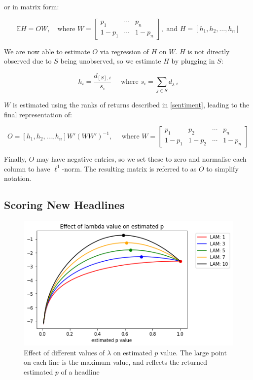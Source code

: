 \noindent
or in matrix form:

\begin{equation}
\mathbb{E}H = OW, \quad \text{where } W = \begin{bmatrix}
      p_1 & \cdots & p_n \\
      1-p_1 & \cdots & 1-p_n
\end{bmatrix}
, \text{ and } H = [h_1,h_2,\dots,h_n]
\end{equation}

\noindent
We are now able to estimate $O$ via regression of $H$ on $W$. $H$ is not directly observed due to $S$ being unobserved, so we estimate $H$ by plugging in $S$:

\begin{equation}
h_i = \frac{d_{[S],i}}{s_i} \quad \text{ where } s_i = \sum_{j \in S} d_{j,i}
\end{equation}

\noindent
$W$ is estimated using the ranks of returns described in \ref{sentiment}, leading to the final representation of:

\begin{equation}
O = [h_1, h_2,\dots, h_n] W' (W W')^{-1}, \quad \text{ where } W = \begin{bmatrix}
      p_1 & p_2 & \cdots & p_n \\
      1-p_1 & 1-p_2 & \cdots & 1-p_n
\end{bmatrix}
\end{equation}

\noindent
Finally, $O$ may have negative entries, so we set these to zero and normalise each column to have $\ell^1$-norm. The resulting matrix is referred to as $O$ to simplify notation.

\subsection{Scoring New Headlines}
\label{sub:new-headlines}

\begin{figure}[!t]
    \begin{center}
        \includegraphics[scale=.75]{./pics/lam-effect.png}
        \caption[Effect of $\lambda$]{Effect of different values of $\lambda$ on estimated $p$ value. The large point on each line is the maximum value, and reflects the returned estimated $p$ of a headline}
        \label{fig:lam-effect}
    \end{center}
\end{figure}

